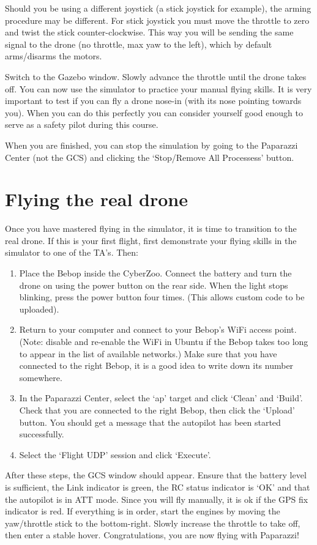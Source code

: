 Should you be using a different joystick (a stick joystick for example), the arming procedure may be different. For stick joystick you must move the throttle to zero and twist the stick counter-clockwise. This way you will be sending the same signal to the drone (no throttle, max yaw to the left), which by default arms/disarms the motors.

Switch to the Gazebo window. Slowly advance the throttle until the drone takes off.
You can now use the simulator to practice your manual flying skills. It is very important to test if you can fly a drone nose-in (with its nose pointing towards you). When you can do this perfectly you can consider yourself good enough to serve as a safety pilot during this course.

When you are finished, you can stop the simulation by going to the Paparazzi Center (not the GCS) and clicking the `Stop/Remove All Processess' button.

\section{Flying the real drone}
Once you have mastered flying in the simulator, it is time to transition to the real drone.
If this is your first flight, first demonstrate your flying skills in the simulator to one of the TA's.
Then:

\begin{enumerate}
	\item Place the Bebop inside the CyberZoo. Connect the battery and turn the drone on using the power button on the rear side. When the light stops blinking, press the power button four times. (This allows custom code to be uploaded).
	\item Return to your computer and connect to your Bebop's WiFi access point. (Note: disable and re-enable the WiFi in Ubuntu if the Bebop takes too long to appear in the list of available networks.)
	Make sure that you have connected to the right Bebop, it is a good idea to write down its number somewhere.
	\item In the Paparazzi Center, select the `ap' target and click `Clean' and `Build'. Check that you are connected to the right Bebop, then click the `Upload' button. You should get a message that the autopilot has been started successfully.
	\item Select the `Flight UDP' session and click `Execute'.
\end{enumerate}

After these steps, the GCS window should appear.
Ensure that the battery level is sufficient, the Link indicator is green, the RC status indicator is `OK' and that the autopilot is in ATT mode. Since you will fly manually, it is ok if the GPS fix indicator is red.
If everything is in order, start the engines by moving the yaw/throttle stick to the bottom-right. Slowly increase the throttle to take off, then enter a stable hover. Congratulations, you are now flying with Paparazzi!

